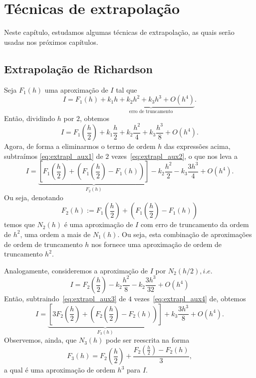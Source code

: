 

\chapter{Técnicas de extrapolação}\label{cap_extrapl}
\thispagestyle{fancy}

Neste capítulo, estudamos algumas técnicas de extrapolação, as quais serão usadas nos próximos capítulos.

\section{Extrapolação de Richardson}\label{cap_extrapl_sec_Richardson}

Seja $F_1(h)$ uma aproximação de $I$ tal que
\begin{equation}\label{eq:extrapl_aux1}
  I = F_1(h) + \underbrace{k_1h + k_2h^2 + k_3h^3 + O(h^4)}_{\text{erro de truncamento}}.
\end{equation}
Então, dividindo $h$ por $2$, obtemos
\begin{equation}\label{eq:extrapl_aux2}
  I = F_1\left(\frac{h}{2}\right) + k_1\frac{h}{2} + k_2\frac{h^2}{4} + k_3\frac{h^3}{8} + O(h^4).
\end{equation}
Agora, de forma a eliminarmos o termo de ordem $h$ das expressões acima, subtraímos \eqref{eq:extrapl_aux1} de $2$ vezes~\eqref{eq:extrapl_aux2}, o que nos leva a
\begin{equation}\label{eq:extrapl_aux3}
  I = \underbrace{\left[F_1\left(\frac{h}{2}\right) + \left(F_1\left(\frac{h}{2}\right) - F_1(h)\right)\right]}_{F_2(h)} - k_2\frac{h^2}{2} - k_3\frac{3h^3}{4} + O(h^4).
\end{equation}
Ou seja, denotando
\begin{equation}
  F_2(h) := F_1\left(\frac{h}{2}\right) + \left(F_1\left(\frac{h}{2}\right) - F_1(h)\right)
\end{equation}
temos que $N_2(h)$ é uma aproximação de $I$ com erro de truncamento da ordem de $h^2$, uma ordem a mais de $N_1(h)$. Ou seja, esta combinação de aproximações de ordem de truncamento $h$ nos fornece uma aproximação de ordem de truncamento $h^2$.

Analogamente, consideremos a aproximação de $I$ por $N_2(h/2), i.e.$
\begin{equation}\label{eq:extrapl_aux4}
  I = F_2\left(\frac{h}{2}\right) - k_2\frac{h^2}{8} - k_2\frac{3h^3}{32} + O(h^4)
\end{equation}
Então, subtraindo~\eqref{eq:extrapl_aux3} de $4$ vezes~\eqref{eq:extrapl_aux4} de, obtemos
\begin{equation}\label{eq:extrapl_aux5}
  I = \underbrace{\left[3F_2\left(\frac{h}{2}\right) + \left(F_2\left(\frac{h}{2}\right) - F_2(h)\right)\right]}_{F_3(h)} + k_3\frac{3h^3}{8} + O(h^4).
\end{equation}
Observemos, ainda, que $N_3(h)$ pode ser reescrita na forma
\begin{equation}
  F_3(h) = F_2\left(\frac{h}{2}\right) + \frac{F_2\left(\frac{h}{2}\right) - F_2(h)}{3},
\end{equation}
a qual é uma aproximação de ordem $h^3$ para $I$.


